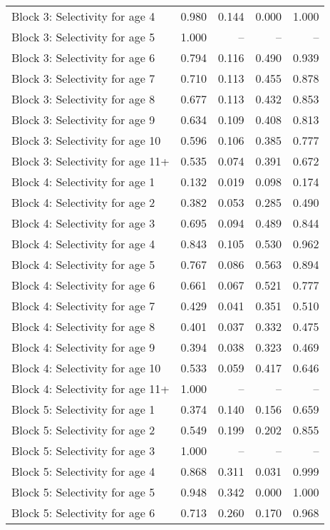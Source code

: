 \documentclass[
]{article}
\begin{document}
\begin{landscape}
\begin{longtable}[t]{lrrrr}
\addlinespace
Block 3: Selectivity for age 4 & 0.980 & 0.144 & 0.000 & 1.000\\
Block 3: Selectivity for age 5 & 1.000 & -- & -- & --\\
Block 3: Selectivity for age 6 & 0.794 & 0.116 & 0.490 & 0.939\\
Block 3: Selectivity for age 7 & 0.710 & 0.113 & 0.455 & 0.878\\
Block 3: Selectivity for age 8 & 0.677 & 0.113 & 0.432 & 0.853\\
\addlinespace
Block 3: Selectivity for age 9 & 0.634 & 0.109 & 0.408 & 0.813\\
Block 3: Selectivity for age 10 & 0.596 & 0.106 & 0.385 & 0.777\\
Block 3: Selectivity for age 11+ & 0.535 & 0.074 & 0.391 & 0.672\\
Block 4: Selectivity for age 1 & 0.132 & 0.019 & 0.098 & 0.174\\
Block 4: Selectivity for age 2 & 0.382 & 0.053 & 0.285 & 0.490\\
\addlinespace
Block 4: Selectivity for age 3 & 0.695 & 0.094 & 0.489 & 0.844\\
Block 4: Selectivity for age 4 & 0.843 & 0.105 & 0.530 & 0.962\\
Block 4: Selectivity for age 5 & 0.767 & 0.086 & 0.563 & 0.894\\
Block 4: Selectivity for age 6 & 0.661 & 0.067 & 0.521 & 0.777\\
Block 4: Selectivity for age 7 & 0.429 & 0.041 & 0.351 & 0.510\\
\addlinespace
Block 4: Selectivity for age 8 & 0.401 & 0.037 & 0.332 & 0.475\\
Block 4: Selectivity for age 9 & 0.394 & 0.038 & 0.323 & 0.469\\
Block 4: Selectivity for age 10 & 0.533 & 0.059 & 0.417 & 0.646\\
Block 4: Selectivity for age 11+ & 1.000 & -- & -- & --\\
Block 5: Selectivity for age 1 & 0.374 & 0.140 & 0.156 & 0.659\\
\addlinespace
Block 5: Selectivity for age 2 & 0.549 & 0.199 & 0.202 & 0.855\\
Block 5: Selectivity for age 3 & 1.000 & -- & -- & --\\
Block 5: Selectivity for age 4 & 0.868 & 0.311 & 0.031 & 0.999\\
Block 5: Selectivity for age 5 & 0.948 & 0.342 & 0.000 & 1.000\\
Block 5: Selectivity for age 6 & 0.713 & 0.260 & 0.170 & 0.968\\

\end{longtable}
\end{landscape}
\end{document}
